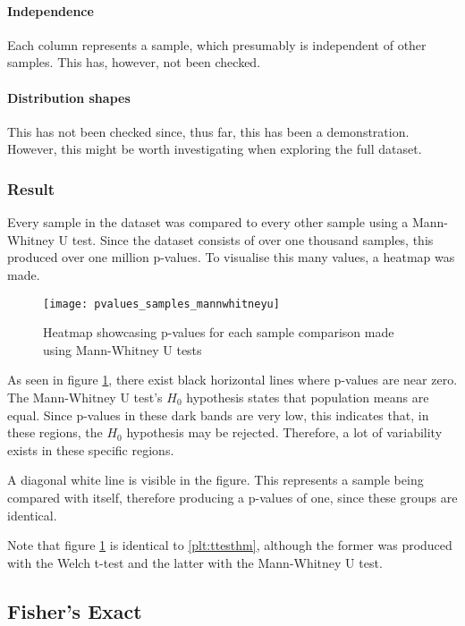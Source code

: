 \paragraph{Independence}
Each column represents a sample, which presumably is independent of other samples.
This has, however, not been checked.

\paragraph{Distribution shapes}
This has not been checked since, thus far, this has been a demonstration.
However, this might be worth investigating when exploring the full dataset.

\subsubsection{Result}
Every sample in the dataset was compared to every other sample using a Mann-Whitney U test.
Since the dataset consists of over one thousand samples, this produced over one million p-values.
To visualise this many values, a heatmap was made.

\begin{figure}[H]
    \centering
    \texttt{[image: pvalues\_samples\_mannwhitneyu]}
    \caption{Heatmap showcasing p-values for each sample comparison made using Mann-Whitney U tests}
    \label{plt:mwuhm}
\end{figure}

As seen in figure \ref{plt:mwuhm}, there exist black horizontal lines where p-values are near zero.
The Mann-Whitney U test's $H_0$ hypothesis states that population means are equal.
Since p-values in these dark bands are very low, this indicates that, in these regions, the $H_0$ hypothesis may be rejected.
Therefore, a lot of variability exists in these specific regions.

A diagonal white line is visible in the figure.
This represents a sample being compared with itself, therefore producing a p-values of one, since these groups are identical.

Note that figure \ref{plt:mwuhm} is identical to \ref{plt:ttesthm}, although the former was produced with the Welch t-test and the latter with the Mann-Whitney U test.

\subsection{Fisher's Exact}

